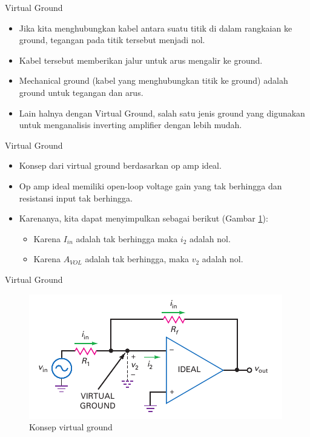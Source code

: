 \begin{frame}{Virtual Ground}
	\begin{itemize}
		\item Jika kita menghubungkan kabel antara suatu titik di dalam rangkaian ke ground, tegangan pada titik tersebut menjadi nol.
		\item Kabel tersebut memberikan jalur untuk arus mengalir ke ground.
		\item Mechanical ground (kabel yang menghubungkan titik ke ground) adalah ground untuk tegangan dan arus.
		\item Lain halnya dengan Virtual Ground, salah satu jenis ground yang digunakan untuk menganalisis inverting amplifier dengan lebih mudah.
	\end{itemize}
\end{frame}

\begin{frame}{Virtual Ground}
	\begin{itemize}
		\item Konsep dari virtual ground berdasarkan op amp ideal.
		\item Op amp ideal memiliki open-loop voltage gain yang tak berhingga dan resistansi input tak berhingga.
		\item Karenanya, kita dapat menyimpulkan sebagai berikut (Gambar \ref{fig-16.13}):
		\begin{itemize}
			\item Karena $ I_{in} $ adalah tak berhingga maka $ i_2 $ adalah nol.
			\item Karena $ A_{VOL} $ adalah tak berhingga, maka $ v_2 $ adalah nol.
		\end{itemize}
	\end{itemize}
\end{frame}

\begin{frame}{Virtual Ground}
	\begin{figure}
		\centering
		\includegraphics[height=0.7\textheight]{gambar/fig-16.13}
		\caption{Konsep virtual ground}
		\label{fig-16.13}
	\end{figure}
\end{frame}

